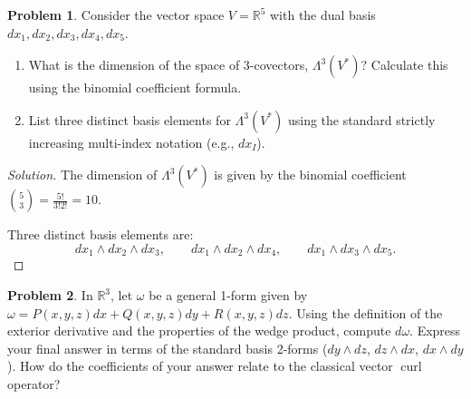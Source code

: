 \documentclass[12pt, a4paper]{article}
\theoremstyle{definition}
\newtheorem{problem}{Problem}
\newenvironment{solution}
  {\renewcommand\qedsymbol{$\blacksquare$}\begin{proof}[Solution]}
  {\end{proof}}
\DeclareMathOperator{\curl}{curl}
\begin{document}
\vfill

\begin{problem}
Consider the vector space $V = \mathbb{R}^5$ with the dual basis $dx_1, dx_2, dx_3, dx_4, dx_5$.
\begin{enumerate}
    \item[(a)] What is the dimension of the space of 3-covectors, $\Lambda^3(V^*)$? Calculate this using the binomial coefficient formula.
    \item[(b)] List three distinct basis elements for $\Lambda^3(V^*)$ using the standard strictly increasing multi-index notation (e.g., $dx_I$).
\end{enumerate}
\end{problem}

\begin{solution}
\item[(a)] The dimension of \(\Lambda^3(V^*)\) is given by the binomial coefficient \(\binom{5}{3} = \frac{5!}{3!2!} = 10\).
    \item[(b)] Three distinct basis elements are:
    \[
    dx_1 \wedge dx_2 \wedge dx_3,\qquad
    dx_1 \wedge dx_2 \wedge dx_4,\qquad
    dx_1 \wedge dx_3 \wedge dx_5.
    \]\end{solution}

\vfill
\newpage

\begin{problem}
In $\mathbb{R}^3$, let $\omega$ be a general 1-form given by $\omega = P(x,y,z) dx + Q(x,y,z) dy + R(x,y,z) dz$. 
Using the definition of the exterior derivative and the properties of the wedge product, compute $d\omega$. Express your final answer in terms of the standard basis 2-forms ($dy \wedge dz$, $dz \wedge dx$, $dx \wedge dy$). How do the coefficients of your answer relate to the classical vector $\curl$ operator?
\end{problem}
\end{document}
